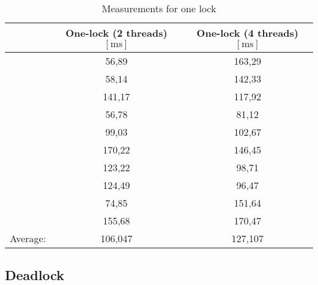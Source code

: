 \documentclass[a4paper,11pt,twoside,fleqn]{article}
\begin{document}
\begin {table}[H]
\caption {Measurements for one lock}\label{tab:title} 
\begin{center}
\begin{tabulary}{0.7\linewidth}{sSS}
\toprule
        & \textnormal{One-lock (2 threads)}$[\si{\milli\second}]$ & \textnormal{One-lock (4 threads)}$[\si{\milli\second}]$ \\
\midrule
        & 56,89                & 163,29               \\
        & 58,14                & 142,33               \\
        & 141,17               & 117,92               \\
        & 56,78                & 81,12                \\
        & 99,03                & 102,67               \\
        & 170,22               & 146,45               \\
        & 123,22               & 98,71                \\
        & 124,49               & 96,47                \\
        & 74,85                & 151,64               \\
        & 155,68               & 170,47               \\
\midrule
Average: & 106,047              & 127,107 \\            
\bottomrule
\end{tabulary}
\end{center}
\end {table}

\subsection{Deadlock}
\end{document}
